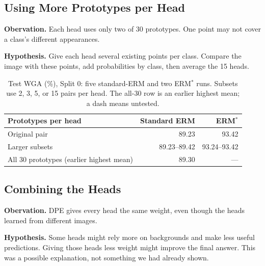 \documentclass[runningheads]{llncs}
\makeatletter
\newenvironment{methodfigure}{\par\medskip\noindent
  \begin{minipage}{\linewidth}\centering\def\@captype{figure}}
  {\end{minipage}\par\medskip}
\makeatother
\begin{document}
\subsection{Using More Prototypes per Head}
\textbf{Obervation.} Each head uses only two of 30 prototypes. One point may not cover a class's different appearances.

\textbf{Hypothesis.} Give each head several existing points per class. Compare the image with these points, add probabilities by class, then average the 15 heads.

\begin{methodfigure}

\caption{Add points within each head. Subsets can differ. Using all 30 points with identical scoring makes every head's answer the same.}
\label{fig:h3}
\end{methodfigure}

\begin{table}[H]
\centering
\caption{Test WGA (\%), Split 0: five standard-ERM and two ERM$^*$ runs. Subsets use 2, 3, 5, or 15 pairs per head. The all-30 row is an earlier highest mean; a dash means untested.}
\label{tab:subset-results}
\small
\begin{tabular}{@{}lrr@{}}
\toprule
Prototypes per head & Standard ERM & ERM$^*$\\
\midrule
Original pair & 89.23 & 93.42\\
Larger subsets & 89.23--89.42 & 93.24--93.42\\
All 30 prototypes (earlier highest mean) & 89.30 & ---\\
\bottomrule
\end{tabular}
\end{table}

\subsection{Combining the Heads}
\textbf{Obervation.} DPE gives every head the same weight, even though the heads learned from different images.

\textbf{Hypothesis.} Some heads might rely more on backgrounds and make less useful predictions. Giving those heads less weight might improve the final answer. This was a possible explanation, not something we had already shown.

\begin{methodfigure}

\caption{The Week 1 idea: compare equal averaging with a weighted sum of the same head predictions. Here $p_i(c\mid x)$ is head $i$'s probability for class $c$ on image $x$. Arrow widths show example weights, not measured reliability.}
\label{fig:h2}
\end{methodfigure}
\end{document}
